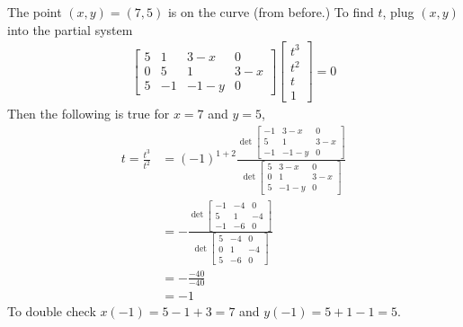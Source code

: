 \begin{numerical-example}
  The point $(x, y) = (7, 5)$ is on the curve (from before.) To find
  $t$, plug $(x, y)$ into the partial system
  \begin{align*}
    \begin{bmatrix}
      5 & 1 & 3-x & 0 \\
      0 & 5 & 1 & 3-x \\
      5 & -1 & -1-y & 0
    \end{bmatrix}
                      \begin{bmatrix}
                        t^3 \\ t^2 \\ t \\ 1
                      \end{bmatrix} = 0
  \end{align*}
  Then the following is true for $x = 7$ and $y=5$,
  \begin{align*}
    t = \frac{t^3}{t^2} &= (-1)^{1+2} \frac{\det
                          \begin{bmatrix}
                            -1 & 3-x & 0 \\
                            5 & 1 & 3-x \\
                            -1 & -1-y & 0
                          \end{bmatrix}
}{\det
                                        \begin{bmatrix}
                                          5 & 3-x & 0 \\
                                          0 & 1 & 3-x \\
                                          5 & -1-y & 0
                                        \end{bmatrix}
                                                     } \\
    &= - \frac{\det \begin{bmatrix}
                            -1 & -4 & 0 \\
                            5 & 1 & -4 \\
                            -1 & -6 & 0
                          \end{bmatrix}}{\det \begin{bmatrix}
                                          5 & -4 & 0 \\
                                          0 & 1 & -4 \\
                                          5 & -6 & 0
                                        \end{bmatrix}} \\
                        &= - \frac{-40}{-40} \\
    &= -1
  \end{align*}
  To double check $x(-1) = 5 - 1 + 3 = 7$ and $y(-1) = 5 + 1- 1 = 5$.
\end{numerical-example}

